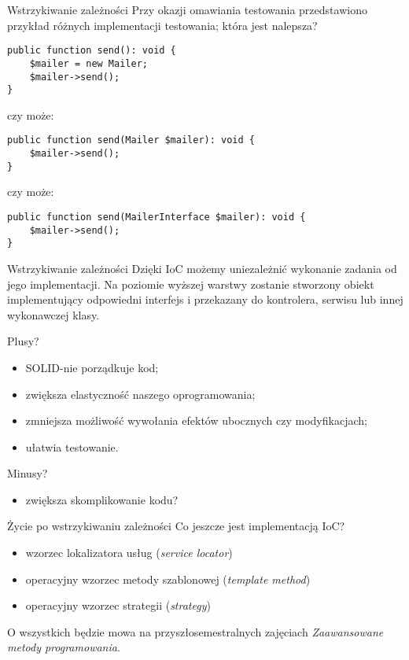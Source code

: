 \begin{frame}[fragile]{Wstrzykiwanie zależności}
	Przy okazji omawiania testowania przedstawiono przykład różnych implementacji testowania; która jest nalepsza?

\begin{lstlisting}
public function send(): void {
    $mailer = new Mailer;
    $mailer->send();
}
\end{lstlisting}

	czy może:

\begin{lstlisting}
public function send(Mailer $mailer): void {
    $mailer->send();
}
\end{lstlisting}

	czy może:

\begin{lstlisting}
public function send(MailerInterface $mailer): void {
    $mailer->send();
}
\end{lstlisting}
\end{frame}

\begin{frame}{Wstrzykiwanie zależności}
	Dzięki IoC możemy uniezależnić wykonanie zadania od jego implementacji. Na poziomie wyższej warstwy zostanie stworzony obiekt implementujący odpowiedni interfejs i przekazany do kontrolera, serwisu lub innej wykonawczej klasy.
\end{frame}

\begin{frame}{Plusy?}
\begin{itemize}
	\item SOLID-nie porządkuje kod;
	\item zwiększa elastyczność naszego oprogramowania;
	\item zmniejsza możliwość wywołania efektów ubocznych czy modyfikacjach;
	\item ułatwia testowanie.
\end{itemize}
\end{frame}

\begin{frame}{Minusy?}
\begin{itemize}
	\item zwiększa skomplikowanie kodu?
\end{itemize}
\end{frame}

\begin{frame}{Życie po wstrzykiwaniu zależności}
	Co jeszcze jest implementacją IoC?

\begin{itemize}
	\item wzorzec lokalizatora usług (\emph{service locator})
	\item operacyjny wzorzec metody szablonowej (\emph{template method})
	\item operacyjny wzorzec strategii (\emph{strategy})
\end{itemize}

	O wszystkich będzie mowa na przyszłosemestralnych zajęciach \emph{Zaawansowane metody programowania}.
\end{frame}


